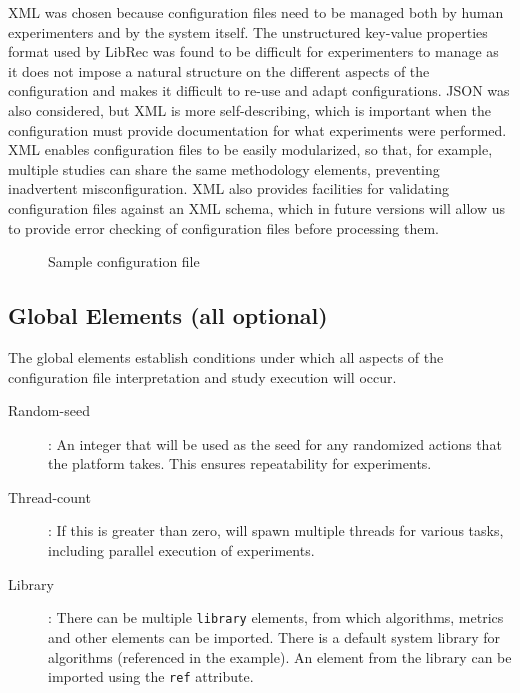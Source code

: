 XML was chosen because configuration files need to be managed both by human experimenters and by the system itself. The unstructured key-value properties format used by LibRec was found to be difficult for experimenters to manage as it does not impose a natural structure on the different aspects of the configuration and makes it difficult to re-use and adapt configurations. JSON was also considered, but XML is more self-describing, which is important when the configuration must provide documentation for what experiments were performed. XML enables configuration files to be easily modularized, so that, for example, multiple studies can share the same methodology elements, preventing inadvertent misconfiguration. XML also provides facilities for validating configuration files against an XML schema, which in future versions will allow us to provide error checking of configuration files before processing them.

\begin{figure}[!htb]
    \centering
    
    \caption{Sample configuration file}
    \label{fig:config}
    \vspace{-0.5in}
\end{figure}

\subsection{Global Elements (all optional)}
\label{subsec:lib_auto_global_elements}

The global elements establish conditions under which all aspects of the configuration file interpretation and study execution will occur.

\begin{description}
    \item[Random-seed]: An integer that will be used as the seed for any randomized actions that the platform takes. This ensures repeatability for experiments.
    \item[Thread-count]: If this is greater than zero, \libauto{} will spawn multiple threads for various tasks, including parallel execution of experiments.
    \item[Library]: There can be multiple \texttt{library} elements, from which algorithms, metrics and other elements can be imported. There is a default system library for algorithms (referenced in the example). An element from the library can be imported using the \texttt{ref} attribute.
\end{description}

